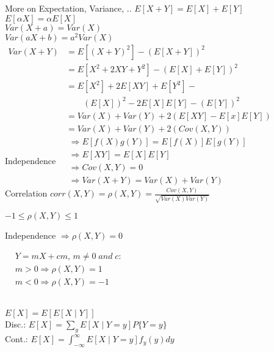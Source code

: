 \documentclass[10pt,english,landscape]{article}
\newenvironment{tight_enumerate}{
\begin{enumerate}[nosep,  partopsep=0pt]
  \setlength{\itemsep}{0pt}
  \setlength{\parskip}{0pt}
}{\end{enumerate}}
\begin{document}
\begin{multicols}{3}
  \begin{defns1}{More on Expectation, Variance, ..}
    $ E[X+Y] = E[X] + E[Y] $ \\
    $ E[\alpha X] = \alpha E[X] $ \\
    $ Var(X+a) = Var(X) $ \\
    $ Var(aX+b) = a^2 Var(X) $ \\
    $ \begin{aligned} Var(X+Y) &= E[(X+Y)^2] - (E[X+Y])^2 \\
                                &= E[X^2 + 2XY + Y^2] - (E[X] + E[Y])^2 \\
                                &= E[X^2] + 2E[XY] + E[Y^2] - \\ & \qquad (E[X])^2 -2E[X]E[Y] - (E[Y])^2 \\
                                &= Var(X) + Var(Y) + 2 ( E[XY] - E[x]E[Y]) \\
                                &= Var(X) + Var(Y) + 2 ( Cov(X,Y) )\end{aligned} $ \\
    Independence $ \begin{aligned} &\Rightarrow E[f(X)g(Y)] = E[f(X)]E[g(Y)]  \\
                                   &\Rightarrow E[XY] = E[X]E[Y]  \\
                                   &\Rightarrow Cov(X,Y) = 0  \\
                                   &\Rightarrow Var(X + Y) = Var(X) + Var(Y) \end{aligned}$ \\
    Correlation $ corr (X,Y) = \rho (X,Y) = \frac{Cov(X,Y)}{\sqrt{Var(X)Var(Y)}}$ \\
    \begin{tight_enumerate}
     \item  $ -1 \leq \rho (X,Y) \leq 1 $
     \item Independence $ \Rightarrow \rho (X,Y) = 0$
     \item $ \begin{aligned} & Y=mX+cm,\, m \neq 0 \; and \; c:  \\
                            & m > 0 \Rightarrow \rho (X,Y) = 1  \\ 
                            & m < 0 \Rightarrow \rho (X,Y) = -1 \end{aligned} $
    \end{tight_enumerate} \\
    $E[X] = E[E[X \mid Y]]  $ \\ 
    Disc.: $E[X] = \sum_y E[X \mid Y=y] P\{Y=y\}  $ \\                
    Cont.: $E[X] = \int_{-\infty}^{\infty} E[X \mid Y=y] f_y(y)dy  $ \\                             
  \end{defns1}
  
  \end{multicols}
  \newpage
\end{document}
